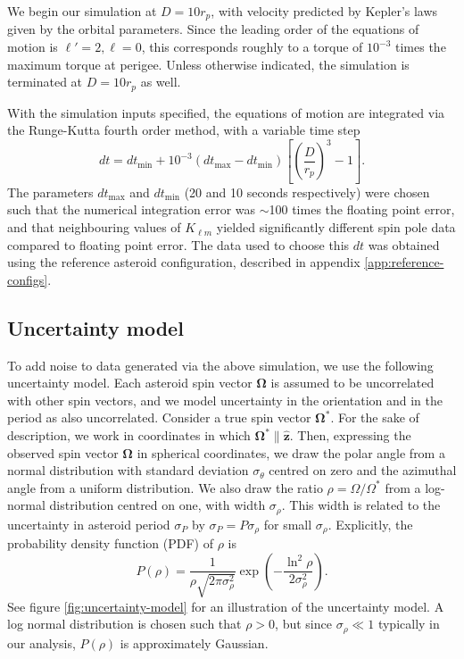 \documentclass[fleqn,usenatbib]{mnras}
\newcommand{\unit}[1]{\bm{\hat{#1}}}
\newcommand{\parens}[1]{\left( #1 \right)}
\newcommand{\brackets}[1]{\left[ #1 \right]}
\begin{document}
We begin our simulation at $D = 10 r_p$, with velocity predicted by Kepler's laws given by the orbital parameters. Since the leading order of the equations of motion is $\ell' = 2, \ell = 0$, this corresponds roughly to a torque of $10^{-3}$ times the maximum torque at perigee. Unless otherwise indicated, the simulation is terminated at $D=10 r_p$ as well.

With the simulation inputs specified, the equations of motion are integrated via the Runge-Kutta fourth order method, with a variable time step
\begin{equation}
  dt = dt_\text{min} + 10^{-3}(dt_\text{max} - dt_\text{min}) \brackets{\parens{\frac{D}{r_p}}^3 - 1}.
\end{equation}
The parameters $dt_\text{max}$ and $dt_\text{min}$ (20 and 10 seconds respectively) were chosen such that the numerical integration error was $\sim$100 times the floating point error, and that neighbouring values of $K_{\ell m}$ yielded significantly different spin pole data compared to floating point error. The data used to choose this $dt$ was obtained using the reference asteroid configuration, described in appendix \ref{app:reference-configs}.



\subsection{Uncertainty model}
\label{sec:uncertainty}

To add noise to data generated via the above simulation, we use the following uncertainty model. Each asteroid spin vector $\bm \Omega$ is assumed to be uncorrelated with other spin vectors, and we model uncertainty in the orientation and in the period as also uncorrelated. Consider a true spin vector $\bm \Omega^*$. For the sake of description, we work in coordinates in which $\bm \Omega^* \parallel \unit z$. Then, expressing the observed spin vector $\bm \Omega$ in spherical coordinates, we draw the polar angle from a normal distribution with standard deviation $\sigma_\theta$ centred on zero and the azimuthal angle from a uniform distribution. We also draw the ratio $\rho=\Omega/\Omega^*$ from a log-normal distribution centred on one, with width $\sigma_\rho$. This width is related to the uncertainty in asteroid period $\sigma_P$ by $\sigma_P=P \sigma_\rho$ for small $\sigma_\rho$. Explicitly, the probability density function (PDF) of $\rho$ is 
\begin{equation}
  P(\rho) = \frac{1}{\rho\sqrt{2\pi \sigma_\rho^2}} \exp\parens{-\frac{\ln^2\rho}{2\sigma_\rho^2}}.
\end{equation}
See figure \ref{fig:uncertainty-model} for an illustration of the uncertainty model. A log normal distribution is chosen such that $\rho > 0$, but since $\sigma_\rho \ll 1$ typically in our analysis, $P(\rho)$ is approximately Gaussian.
\end{document}
